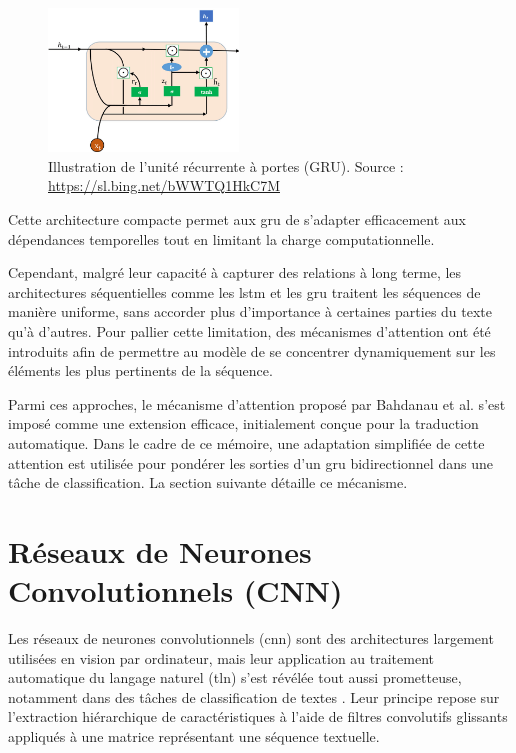 \documentclass[12pt]{report}
\begin{document}
\begin{figure}[H]
    \centering
    \includegraphics[width=0.45\textwidth]{gru_image.png}
    \caption{Illustration de l'unité récurrente à portes (GRU). Source : \url{https://sl.bing.net/bWWTQ1HkC7M}}
    \label{fig:gru_architecture}
\end{figure}

Cette architecture compacte permet aux \gls{gru} de s’adapter efficacement aux dépendances temporelles tout en limitant la charge computationnelle.

\vspace{0.5cm}

Cependant, malgré leur capacité à capturer des relations à long terme, les architectures séquentielles comme les \gls{lstm} et les \gls{gru} traitent les séquences de manière uniforme, sans accorder plus d’importance à certaines parties du texte qu’à d’autres. Pour pallier cette limitation, des mécanismes d’attention ont été introduits afin de permettre au modèle de se concentrer dynamiquement sur les éléments les plus pertinents de la séquence.

Parmi ces approches, le mécanisme d’attention proposé par Bahdanau et al. \cite{bahdanau2015neural} s’est imposé comme une extension efficace, initialement conçue pour la traduction automatique. Dans le cadre de ce mémoire, une adaptation simplifiée de cette attention est utilisée pour pondérer les sorties d’un \gls{gru} bidirectionnel dans une tâche de classification. La section suivante détaille ce mécanisme.

\section{Réseaux de Neurones Convolutionnels (CNN)}

Les réseaux de neurones convolutionnels (\gls{cnn}) sont des architectures largement utilisées en vision par ordinateur, mais leur application au traitement automatique du langage naturel (\gls{tln}) s’est révélée tout aussi prometteuse, notamment dans des tâches de classification de textes \cite{kim2014convolutional}. Leur principe repose sur l’extraction hiérarchique de caractéristiques à l’aide de filtres convolutifs glissants appliqués à une matrice représentant une séquence textuelle. 
\end{document}
